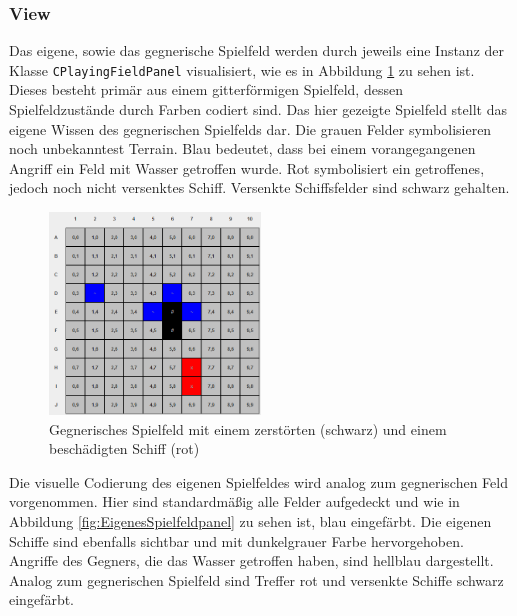 \subsubsection{View}

Das eigene, sowie das gegnerische Spielfeld werden durch jeweils eine Instanz der Klasse \texttt{CPlayingFieldPanel} visualisiert, wie es in Abbildung \ref{fig:Spielfeldpanel} zu sehen ist.
Dieses besteht primär aus einem gitterförmigen Spielfeld, dessen Spielfeldzustände durch Farben codiert sind.
Das hier gezeigte Spielfeld stellt das eigene Wissen des gegnerischen Spielfelds dar.
Die grauen Felder symbolisieren noch unbekanntest Terrain.
Blau bedeutet, dass bei einem vorangegangenen Angriff ein Feld mit Wasser getroffen wurde.
Rot symbolisiert ein getroffenes, jedoch noch nicht versenktes Schiff.
Versenkte Schiffsfelder sind schwarz gehalten.

\begin{figure}[H]
  \centering
  \includegraphics[width=0.5\textwidth]{images/JavaPlayingFieldPanel.png}
  \caption{Gegnerisches Spielfeld mit einem zerstörten (schwarz) und einem beschädigten Schiff (rot)}
  \label{fig:Spielfeldpanel}
\end{figure}

Die visuelle Codierung des eigenen Spielfeldes wird analog zum gegnerischen Feld vorgenommen.
Hier sind standardmäßig alle Felder aufgedeckt und wie in Abbildung \ref{fig:EigenesSpielfeldpanel} zu sehen ist, blau eingefärbt.
Die eigenen Schiffe sind ebenfalls sichtbar und mit dunkelgrauer Farbe hervorgehoben.
Angriffe des Gegners, die das Wasser getroffen haben, sind hellblau dargestellt.
Analog zum gegnerischen Spielfeld sind Treffer rot und versenkte Schiffe schwarz eingefärbt.

